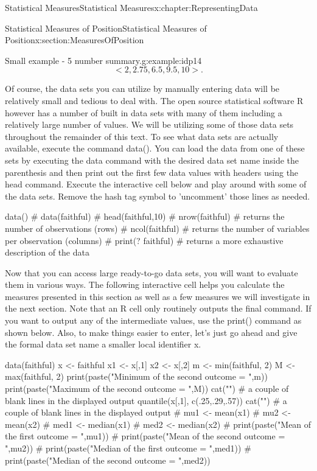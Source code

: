 \documentclass[oneside,10pt,]{book}
\numberwithin{equation}{section}
\newcommand{\lt}{<}
\newcommand{\gt}{>}
\begin{document}
\begin{chapterptx}{Statistical Measures}{}{Statistical Measures}{}{}{x:chapter:RepresentingData}
\begin{sectionptx}{Statistical Measures of Position}{}{Statistical Measures of Position}{}{}{x:section:MeasuresOfPosition}
\begin{example}{Small example - 5 number summary.}{g:example:idp14}
\begin{equation*}
\lt 2, 2.75, 6.5, 9.5, 10 \gt .
\end{equation*}
%
\end{example}
Of course, the data sets you can utilize by manually entering data will be relatively small and tedious to deal with. The open source statistical software R however has a number of built in data sets with many of them including a relatively large number of values. We will be utilizing some of those data sets throughout the remainder of this text. To see what data sets are actually available, execute the command data(). You can load the data from one of these sets by executing the data command with the desired data set name inside the parenthesis and then print out the first few data values with headers using the head command. Execute the interactive cell below and play around with some of the data sets. Remove the hash tag symbol to 'uncomment' those lines as needed.%
\begin{sageinput}
data()
# data(faithful)
# head(faithful,10)
# nrow(faithful)  # returns the number of observations (rows)
# ncol(faithful)  # returns the number of variables per observation (columns)
# print(? faithful)            # returns a more exhaustive description of the data
\end{sageinput}
Now that you can access large ready-to-go data sets, you will want to evaluate them in various ways. The following interactive cell helps you calculate the measures presented in this section as well as a few measures we will investigate in the next section. Note that an R cell only routinely outputs the final command. If you want to output any of the intermediate values, use the print() command as shown below. Also, to make things easier to enter, let's just go ahead and give the formal data set name a smaller local identifier x.%
\begin{sageinput}
data(faithful)
x <- faithful
x1 <- x[,1]
x2 <- x[,2]
m <- min(faithful, 2)
M <- max(faithful, 2)
print(paste("Minimum of the second outcome = ",m))
print(paste("Maximum of the second outcome = ",M))
cat("\n\n")   #  a couple of blank lines in the displayed output
quantile(x[,1], c(.25,.29,.57))
cat("\n\n")   #  a couple of blank lines in the displayed output
# mu1 <- mean(x1)
# mu2 <- mean(x2)
# med1 <- median(x1)
# med2 <- median(x2)
# print(paste("Mean of the first outcome = ",mu1))
# print(paste("Mean of the second outcome = ",mu2))
# print(paste("Median of the first outcome = ",med1))
# print(paste("Median of the second outcome = ",med2))
\end{sageinput}

\end{sectionptx}
\end{chapterptx}
\end{document}
